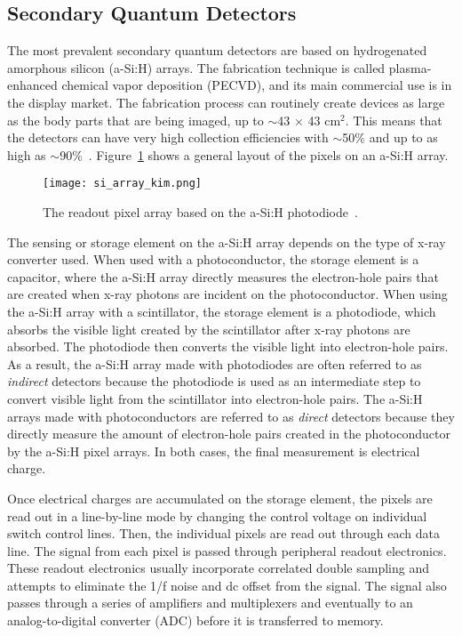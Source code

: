 \subsection{Secondary Quantum Detectors}
The most prevalent secondary quantum detectors are based on hydrogenated amorphous silicon (a-Si:H) arrays.  The fabrication technique is called plasma-enhanced chemical vapor deposition (PECVD), and its main commercial use is in the display market.  The fabrication process can routinely create devices as large as the body parts that are being imaged, up to $\sim$43 $\times$ 43 $\mathrm{cm^2}$.  This means that the detectors can have very high collection efficiencies with $\sim$50$\%$ and up to as high as $\sim$90$\%$~\citep{Yorkston2007}.
Figure~\ref{fig:a-Si:H array} shows a general layout of the pixels on an a-Si:H array.  

\begin{figure}[ht]
\texttt{[image: si\_array\_kim.png]}
\caption{The readout pixel array based on the a-Si:H photodiode~\citep{Kim2008}.}
\label{fig:a-Si:H array}
\end{figure}

The sensing or storage element on the a-Si:H array depends on the type of x-ray converter used.  When used with a photoconductor, the storage element is a capacitor, where the a-Si:H array directly measures the electron-hole pairs that are created when x-ray photons are incident on the photoconductor.  When using the a-Si:H array with a scintillator, the storage element is a photodiode, which absorbs the visible light created by the scintillator after x-ray photons are absorbed. The photodiode then converts the visible light into electron-hole pairs.  As a result, the a-Si:H array made with photodiodes are often referred to as \textit{indirect} detectors because the photodiode is used as an intermediate step to convert visible light from the scintillator into electron-hole pairs.  The a-Si:H arrays made with photoconductors are referred to as \textit{direct} detectors because they directly measure the amount of electron-hole pairs created in the photoconductor by the a-Si:H pixel arrays.  In both cases, the final measurement is electrical charge.  

Once electrical charges are accumulated on the storage element, the pixels are read out in a line-by-line mode by changing the control voltage on individual switch control lines.  Then, the individual pixels are read out through each data line.  The signal from each pixel is passed through peripheral readout electronics.  These readout electronics usually incorporate correlated double sampling and attempts to eliminate the 1/f noise and dc offset from the signal.  The signal also passes through a series of amplifiers and multiplexers and eventually to an analog-to-digital converter (ADC) before it is transferred to memory.  

